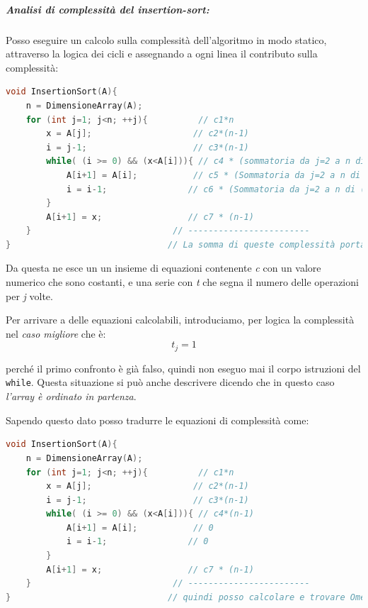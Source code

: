 \documentclass[
  paper=a4,
  oneside  ,captions=tableheading
]{scrbook}
\newcommand{\passthrough}[1]{#1}
\begin{document}
\hypertarget{analisi-di-complessituxe0-del-insertion-sort}{%
\subparagraph{\texorpdfstring{Analisi di complessità del
\emph{insertion-sort}:}{Analisi di complessità del insertion-sort:}}\label{analisi-di-complessituxe0-del-insertion-sort}}

Posso eseguire un calcolo sulla complessità dell'algoritmo in modo
statico, attraverso la logica dei cicli e assegnando a ogni linea il
contributo sulla complessità:

\begin{lstlisting}[language={C++}]
void InsertionSort(A){
    n = DimensioneArray(A);
    for (int j=1; j<n; ++j){          // c1*n
        x = A[j];                    // c2*(n-1)
        i = j-1;                     // c3*(n-1)
        while( (i >= 0) && (x<A[i])){ // c4 * (sommatoria da j=2 a n di tj)
            A[i+1] = A[i];           // c5 * (Sommatoria da j=2 a n di (tj-1))
            i = i-1;                // c6 * (Sommatoria da j=2 a n di (tj-1))
        }
        A[i+1] = x;                 // c7 * (n-1)
    }                            // ------------------------
}                               // La somma di queste complessità porta alla funzione T(n), dove n è il numero di operazioni.
\end{lstlisting}

Da questa ne esce un un insieme di equazioni contenente \emph{c} con un
valore numerico che sono costanti, e una serie con \emph{t} che segna il
numero delle operazioni per \emph{j} volte.

Per arrivare a delle equazioni calcolabili, introduciamo, per logica la
complessità nel \emph{caso migliore} che è: \[
t_j = 1
\]

perché il primo confronto è già falso, quindi non eseguo mai il corpo
istruzioni del \passthrough{\lstinline!while!}. Questa situazione si può
anche descrivere dicendo che in questo caso \emph{l'array è ordinato in
partenza}.

Sapendo questo dato posso tradurre le equazioni di complessità come:

\begin{lstlisting}[language={C++}]
void InsertionSort(A){
    n = DimensioneArray(A);
    for (int j=1; j<n; ++j){          // c1*n
        x = A[j];                    // c2*(n-1)
        i = j-1;                     // c3*(n-1)
        while( (i >= 0) && (x<A[i])){ // c4*(n-1)
            A[i+1] = A[i];           // 0
            i = i-1;                // 0
        }
        A[i+1] = x;                 // c7 * (n-1)
    }                            // ------------------------
}                               // quindi posso calcolare e trovare Omega.
\end{lstlisting}
\end{document}
